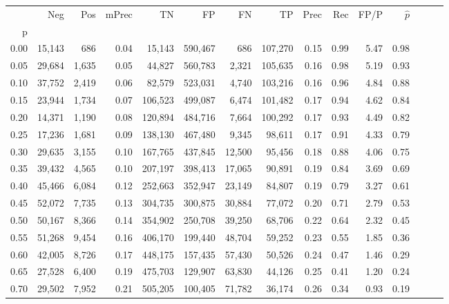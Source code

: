 \begin{tabular}{rrrrrrrrrrrrrrr}
\toprule
{} &     Neg &     Pos & mPrec &       TN &       FP &       FN &       TP &  Prec &   Rec &  FP/P & $\hat{p}$ \\
p    &         &         &       &          &          &          &          &       &       &       &           \\
\midrule
0.00 &  15,143 &     686 &  0.04 &   15,143 &  590,467 &      686 &  107,270 &  0.15 &  0.99 &  5.47 &      0.98 \\
0.05 &  29,684 &   1,635 &  0.05 &   44,827 &  560,783 &    2,321 &  105,635 &  0.16 &  0.98 &  5.19 &      0.93 \\
0.10 &  37,752 &   2,419 &  0.06 &   82,579 &  523,031 &    4,740 &  103,216 &  0.16 &  0.96 &  4.84 &      0.88 \\
0.15 &  23,944 &   1,734 &  0.07 &  106,523 &  499,087 &    6,474 &  101,482 &  0.17 &  0.94 &  4.62 &      0.84 \\
0.20 &  14,371 &   1,190 &  0.08 &  120,894 &  484,716 &    7,664 &  100,292 &  0.17 &  0.93 &  4.49 &      0.82 \\
0.25 &  17,236 &   1,681 &  0.09 &  138,130 &  467,480 &    9,345 &   98,611 &  0.17 &  0.91 &  4.33 &      0.79 \\
0.30 &  29,635 &   3,155 &  0.10 &  167,765 &  437,845 &   12,500 &   95,456 &  0.18 &  0.88 &  4.06 &      0.75 \\
0.35 &  39,432 &   4,565 &  0.10 &  207,197 &  398,413 &   17,065 &   90,891 &  0.19 &  0.84 &  3.69 &      0.69 \\
0.40 &  45,466 &   6,084 &  0.12 &  252,663 &  352,947 &   23,149 &   84,807 &  0.19 &  0.79 &  3.27 &      0.61 \\
0.45 &  52,072 &   7,735 &  0.13 &  304,735 &  300,875 &   30,884 &   77,072 &  0.20 &  0.71 &  2.79 &      0.53 \\
0.50 &  50,167 &   8,366 &  0.14 &  354,902 &  250,708 &   39,250 &   68,706 &  0.22 &  0.64 &  2.32 &      0.45 \\
0.55 &  51,268 &   9,454 &  0.16 &  406,170 &  199,440 &   48,704 &   59,252 &  0.23 &  0.55 &  1.85 &      0.36 \\
0.60 &  42,005 &   8,726 &  0.17 &  448,175 &  157,435 &   57,430 &   50,526 &  0.24 &  0.47 &  1.46 &      0.29 \\
0.65 &  27,528 &   6,400 &  0.19 &  475,703 &  129,907 &   63,830 &   44,126 &  0.25 &  0.41 &  1.20 &      0.24 \\
0.70 &  29,502 &   7,952 &  0.21 &  505,205 &  100,405 &   71,782 &   36,174 &  0.26 &  0.34 &  0.93 &      0.19 \\

\end{tabular}
